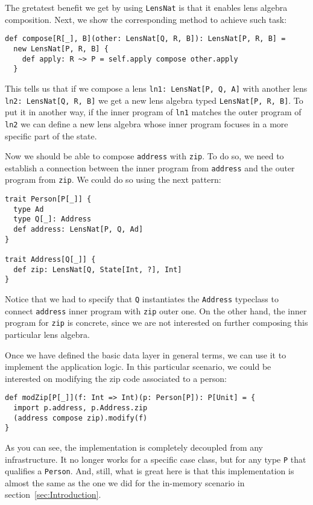 \documentclass[preview, 3p]{elsarticle}
\begin{document}
The gretatest benefit we get by using \lstinline{LensNat} is that it enables
lens algebra composition. Next, we show the corresponding method to achieve such
task:
\begin{lstlisting}
def compose[R[_], B](other: LensNat[Q, R, B]): LensNat[P, R, B] =
  new LensNat[P, R, B] {
    def apply: R ~> P = self.apply compose other.apply
  }
\end{lstlisting}

This tells us that if we compose a lens \lstinline{ln1: LensNat[P, Q, A]} with
another lens \lstinline{ln2: LensNat[Q, R, B]} we get a new lens algebra typed
\lstinline{LensNat[P, R, B]}. To put it in another way, if the inner program of
\lstinline{ln1} matches the outer program of \lstinline{ln2} we can define a new
lens algebra whose inner program focuses in a more specific part of the state.

Now we should be able to compose \lstinline{address} with \lstinline{zip}. To do
so, we need to establish a connection between the inner program from
\lstinline{address} and the outer program from \lstinline{zip}. We could do so
using the next pattern:
\begin{lstlisting}
trait Person[P[_]] {
  type Ad
  type Q[_]: Address
  def address: LensNat[P, Q, Ad]
}

trait Address[Q[_]] {
  def zip: LensNat[Q, State[Int, ?], Int]
}
\end{lstlisting}
Notice that we had to specify that \lstinline{Q} instantiates the
\lstinline{Address} typeclass to connect \lstinline{address} inner program with
\lstinline{zip} outer one. On the other hand, the inner program for
\lstinline{zip} is concrete, since we are not interested on further composing
this particular lens algebra.

Once we have defined the basic data layer in general terms, we can use it to
implement the application logic. In this particular scenario, we could be
interested on modifying the zip code associated to a person:
\begin{lstlisting}
def modZip[P[_]](f: Int => Int)(p: Person[P]): P[Unit] = {
  import p.address, p.Address.zip
  (address compose zip).modify(f)
}
\end{lstlisting}
As you can see, the implementation is completely decoupled from any
infrastructure. It no longer works for a specific case class, but for any type
\lstinline{P} that qualifies a \lstinline{Person}. And, still, what is great
here is that this implementation is almost the same as the one we did for the
in-memory scenario in section~\ref{sec:Introduction}.
\end{document}
